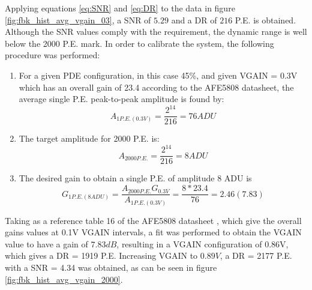 Applying equations \ref{eq:SNR} and \ref{eq:DR} to the data in figure \ref{fig:fbk_hist_avg_vgain_03}, a SNR of $5.29$ and a DR of $216$ P.E. is obtained. Although the SNR values comply with the requirement, the dynamic range is well below the 2000 P.E. mark. In order to calibrate the system, the following procedure was performed:

\begin{enumerate}
    \item For a given PDE configuration, in this case 45\%, and given VGAIN = 0.3V which has an overall gain of 23.4 according to the AFE5808 datasheet, the average single P.E. peak-to-peak amplitude is found by: \begin{equation}
        A_{1P.E.(0.3V)} = \frac{2^{14}}{216} = 76 ADU
    \end{equation}
    \item The target amplitude for 2000 P.E. is:
    \begin{equation}
        A_{2000P.E.} = \frac{2^{14}}{216} = 8 ADU
    \end{equation}
    \item The desired gain to obtain a single P.E. of amplitude 8 ADU is 
    \begin{equation}
        G_{1P.E.(8ADU)} = \frac{A_{2000P.E.}G_{0.3V}}{A_{1P.E.(0.3V)}} = \frac{8*23.4}{76} = 2.46(7.83)
    \end{equation}
\end{enumerate}

Taking as a reference table 16 of the AFE5808 datasheet \cite{afe5808a}, which give the overall gains values at 0.1V VGAIN intervals, a fit was performed to obtain the VGAIN value to have a gain of $7.83dB$, resulting in a VGAIN configuration of 0.86V, which gives a DR = 1919 P.E. Increasing VGAIN to $0.89V$, a DR = 2177 P.E. with a SNR = 4.34 was obtained, as can be seen in figure \ref{fig:fbk_hist_avg_vgain_2000}.

